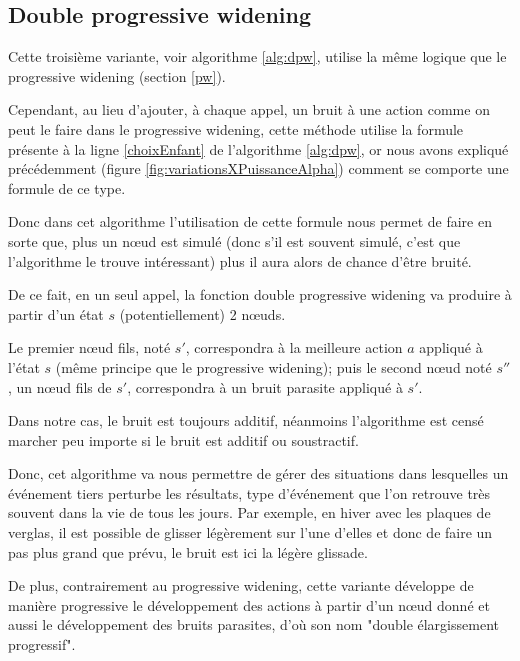 \documentclass[pdftex,french, english]{article}	%
\begin{document}
	\subsection{Double progressive widening} \label{dpw}

			Cette troisième variante, voir algorithme \ref{alg:dpw}, utilise la même logique que le progressive widening (section \ref{pw}).

	Cependant, au lieu d'ajouter, à chaque appel, un bruit à une action comme on peut le faire dans le progressive widening, cette méthode utilise la formule présente à la ligne \ref{choixEnfant} de l'algorithme \ref{alg:dpw}, or nous avons expliqué précédemment (figure \ref{fig:variationsXPuissanceAlpha}) comment se comporte une formule de ce type.
    
    Donc dans cet algorithme l'utilisation de cette formule nous permet de faire en sorte que, plus un nœud est simulé (donc s'il est souvent simulé, c'est que l'algorithme le trouve intéressant) plus il aura alors de chance d'être bruité. 
			
            De ce fait, en un seul appel, la fonction double progressive widening va produire à partir d'un état $s$ (potentiellement) 2 nœuds.

			Le premier nœud fils, noté $s'$, correspondra à la meilleure action $a$ appliqué à l'état $s$ (même principe que le progressive widening); puis le second nœud noté $s''$, un nœud fils de $s'$, correspondra à un bruit parasite appliqué à $s'$.
			
            Dans notre cas, le bruit est toujours additif, néanmoins l'algorithme est censé marcher peu importe si le bruit est additif ou soustractif.

			Donc, cet algorithme va nous permettre de gérer des situations dans lesquelles un événement tiers perturbe les résultats, type d’événement que l'on retrouve très souvent dans la vie de tous les jours. Par exemple, en hiver avec les plaques de verglas, il est possible de glisser légèrement sur l'une d'elles et donc de faire un pas plus grand que prévu, le bruit est ici la légère glissade.
            
            De plus, contrairement au progressive widening, cette variante développe de manière progressive le développement des actions à partir d'un nœud donné et aussi le développement des bruits parasites, d'où son nom "double élargissement progressif".
\end{document}
